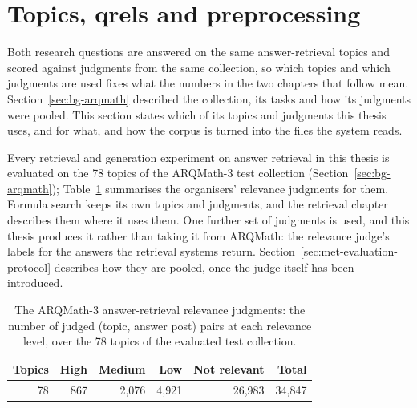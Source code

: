 
\section{Topics, qrels and preprocessing}\label{sec:met-collection}

Both research questions are answered on the same answer-retrieval topics and scored against
judgments from the same collection, so which topics and which judgments are used
fixes what the numbers in the two chapters that follow mean.
Section~\ref{sec:bg-arqmath} described the collection, its tasks and how its
judgments were pooled. This section states which of its topics and judgments this
thesis uses, and for what, and how the corpus is turned into the files the system
reads.

Every retrieval and generation experiment on answer retrieval in this thesis is evaluated on
the 78 topics of the ARQMath-3 test collection (Section~\ref{sec:bg-arqmath});
Table~\ref{tab:met-qrels} summarises the organisers' relevance judgments for them.
Formula search keeps its own topics and judgments, and the retrieval chapter describes
them where it uses them. One further set of judgments is used, and this thesis
produces it rather than taking it from ARQMath: the relevance judge's labels for
the answers the retrieval systems return. Section~\ref{sec:met-evaluation-protocol}
describes how they are pooled, once the judge itself has been introduced.

\begin{table}[t]
\centering
\begin{tabular}{rrrrrr}
\toprule
Topics & High & Medium & Low & Not relevant & Total \\
\midrule
78 & 867 & 2{,}076 & 4{,}921 & 26{,}983 & 34{,}847 \\
\bottomrule
\end{tabular}
\caption[The ARQMath-3 relevance judgments]{The ARQMath-3 answer-retrieval relevance judgments: the number of judged (topic,
answer post) pairs at each relevance level, over the 78 topics of the evaluated
test collection.}
\label{tab:met-qrels}
\end{table}

